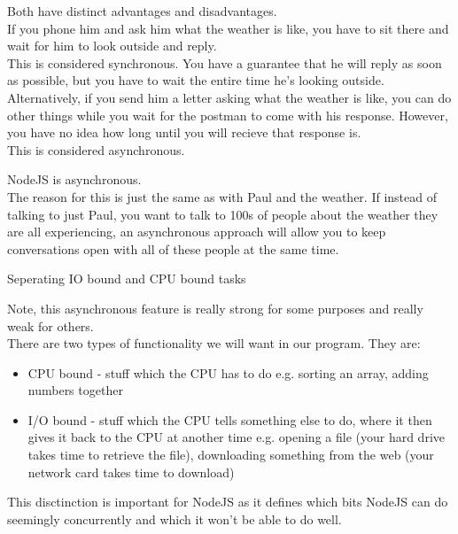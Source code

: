 \documentclass{beamer}
\begin{document}
\begin{frame}

Both have distinct advantages and disadvantages.\\
\pause
If you phone him and ask him what the weather is like, you have to sit there and wait for him to look outside and reply.\\
\pause
This is considered synchronous. You have a guarantee that he will reply as soon as possible, but you have to wait the entire time he's looking outside.\\
\pause
Alternatively, if you send him a letter asking what the weather is like, you can do other things while you wait for the postman to come with his response. However, you have no idea how long until you will recieve that response is.\\
\pause
This is considered asynchronous.

\end{frame}

\begin{frame}

NodeJS is asynchronous.\\ \pause
The reason for this is just the same as with Paul and the weather. \pause If instead of talking to just Paul, you want to talk to 100s of people about the weather they are all experiencing, an asynchronous approach will allow you to keep conversations open with all of these people at the same time.\\

\end{frame}

\begin{frame}{Seperating IO bound and CPU bound tasks}

Note, this asynchronous feature is really strong for some purposes and really weak for others.\\
There are two types of functionality we will want in our program. They are:
\pause
\begin{itemize}
  \item CPU bound \pause - stuff which the CPU has to do e.g. sorting an array, adding numbers together \pause
  \item I/O bound \pause - stuff which the CPU tells something else to do, where it then gives it back to the CPU at another time e.g. opening a file (your hard drive takes time to retrieve the file), downloading something from the web (your network card takes time to download)
\end{itemize}

\pause

This disctinction is important for NodeJS as it defines which bits NodeJS can do seemingly concurrently and which it won't be able to do well.

\end{frame}
\end{document}
